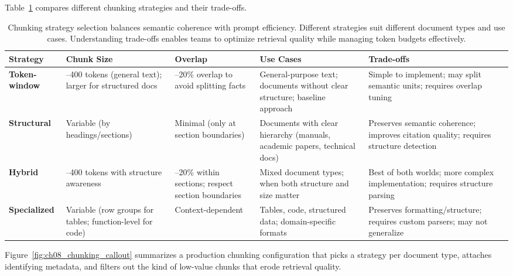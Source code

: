Table~\ref{tab:ch08_chunking_strategies} compares different chunking strategies and their trade-offs.

\begin{table}[tb]
\centering
\small
\caption{Chunking strategy selection balances semantic coherence with prompt efficiency. Different strategies suit different document types and use cases. Understanding trade-offs enables teams to optimize retrieval quality while managing token budgets effectively.}
\label{tab:ch08_chunking_strategies}
\setlength{\tabcolsep}{6pt}
\renewcommand{\arraystretch}{1.3}
\begin{tabularx}{\linewidth}{@{}>{\raggedright\arraybackslash}p{3cm}>{\raggedright\arraybackslash}p{2cm}>{\raggedright\arraybackslash}p{1.8cm}>{\raggedright\arraybackslash}X>{\raggedright\arraybackslash}X@{}}
\toprule
\rowcolor{gray!15}
\textbf{Strategy} & \textbf{Chunk Size} & \textbf{Overlap} & \textbf{Use Cases} & \textbf{Trade-offs} \\
\midrule
\textbf{Token-window} & 200--400 tokens (general text); larger for structured docs & 10--20\% overlap to avoid splitting facts & General-purpose text; documents without clear structure; baseline approach & Simple to implement; may split semantic units; requires overlap tuning \\
\addlinespace[1pt]
\textbf{Structural} & Variable (by headings/sections) & Minimal (only at section boundaries) & Documents with clear hierarchy (manuals, academic papers, technical docs) & Preserves semantic coherence; improves citation quality; requires structure detection \\
\addlinespace[1pt]
\textbf{Hybrid} & 200--400 tokens with structure awareness & 10--20\% within sections; respect section boundaries & Mixed document types; when both structure and size matter & Best of both worlds; more complex implementation; requires structure parsing \\
\addlinespace[1pt]
\textbf{Specialized} & Variable (row groups for tables; function-level for code) & Context-dependent & Tables, code, structured data; domain-specific formats & Preserves formatting/structure; requires custom parsers; may not generalize \\
\bottomrule
\end{tabularx}
\end{table}

Figure~\ref{fig:ch08_chunking_callout} summarizes a production chunking configuration that picks a strategy per document type, attaches identifying metadata, and filters out the kind of low-value chunks that erode retrieval quality.

